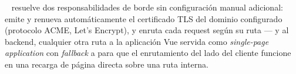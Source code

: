 ~\cite{caddy} resuelve dos responsabilidades de borde sin configuración manual adicional: emite y renueva automáticamente el certificado TLS del dominio configurado (protocolo ACME, Let's Encrypt), y enruta cada request según su ruta ---  y  al backend, cualquier otra ruta a la aplicación Vue servida como \emph{single-page application} con \emph{fallback} a  para que el enrutamiento del lado del cliente funcione en una recarga de página directa sobre una ruta interna.
